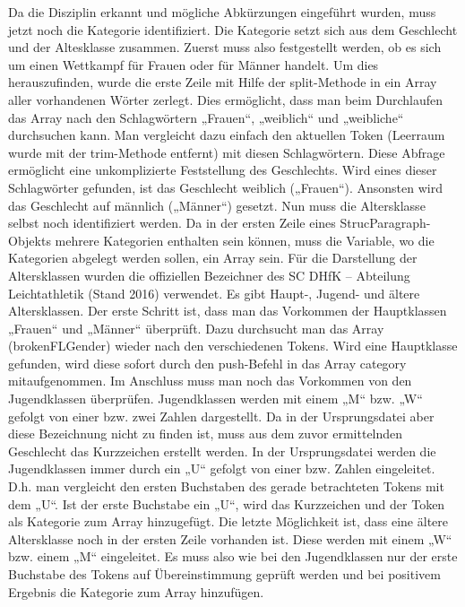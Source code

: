 {Da die Disziplin erkannt und mögliche Abkürzungen eingeführt wurden, muss jetzt noch die Kategorie identifiziert. Die Kategorie setzt sich aus dem Geschlecht und der Altesklasse zusammen. Zuerst muss also festgestellt werden, ob es sich um einen Wettkampf für Frauen oder für Männer handelt. Um dies herauszufinden, wurde die erste Zeile mit Hilfe der split-Methode in ein Array aller vorhandenen Wörter zerlegt. Dies ermöglicht, dass man beim Durchlaufen das Array nach den Schlagwörtern „Frauen“, „weiblich“ und „weibliche“ durchsuchen kann. Man vergleicht dazu einfach den aktuellen Token (Leerraum wurde mit der trim-Methode entfernt) mit diesen Schlagwörtern. Diese Abfrage ermöglicht eine unkomplizierte Feststellung des Geschlechts. Wird eines dieser Schlagwörter gefunden, ist das Geschlecht weiblich („Frauen“). Ansonsten wird das Geschlecht auf männlich („Männer“) gesetzt. 
Nun muss die Altersklasse selbst noch identifiziert werden. Da in der ersten Zeile eines StrucParagraph-Objekts mehrere Kategorien enthalten sein können, muss die Variable, wo die Kategorien abgelegt werden sollen, ein Array sein. Für die Darstellung der Altersklassen wurden die offiziellen Bezeichner des SC DHfK – Abteilung Leichtathletik (Stand 2016) verwendet. Es gibt Haupt-, Jugend- und ältere Altersklassen.  Der erste Schritt ist, dass man das Vorkommen der Hauptklassen „Frauen“ und „Männer“ überprüft. Dazu durchsucht man das Array (brokenFLGender) wieder nach den verschiedenen Tokens. Wird eine Hauptklasse gefunden, wird diese sofort durch den push-Befehl in das Array category mitaufgenommen.
Im Anschluss muss man noch das Vorkommen von den Jugendklassen überprüfen. Jugendklassen werden mit einem „M“ bzw. „W“ gefolgt von einer bzw. zwei Zahlen dargestellt. Da in der Ursprungsdatei aber diese Bezeichnung nicht zu finden ist, muss aus dem zuvor ermittelnden Geschlecht das Kurzzeichen erstellt werden. In der Ursprungsdatei werden die Jugendklassen immer durch ein „U“ gefolgt von einer bzw. Zahlen eingeleitet. D.h. man vergleicht den ersten Buchstaben des gerade betrachteten Tokens mit dem „U“. Ist der erste Buchstabe ein „U“, wird das Kurzzeichen und der Token als Kategorie zum Array hinzugefügt. 
Die letzte Möglichkeit ist, dass eine ältere Altersklasse noch in der ersten Zeile vorhanden ist. Diese werden mit einem „W“ bzw. einem „M“ eingeleitet. Es muss also wie bei den Jugendklassen nur der erste Buchstabe des Tokens auf Übereinstimmung geprüft werden und bei positivem Ergebnis die Kategorie zum Array hinzufügen.

}
